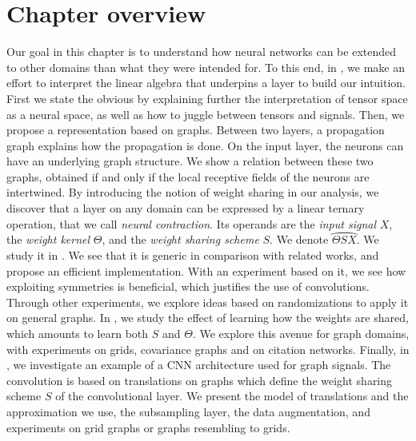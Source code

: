 \section*{Chapter overview}

Our goal in this chapter is to understand how neural networks can be extended to other domains than what they were intended for. To this end, in , we make an effort to interpret the linear algebra that underpins a layer to build our intuition. First we state the obvious by explaining further the interpretation of tensor space as a neural space, as well as how to juggle between tensors and signals. Then, we propose a representation based on graphs. Between two layers, a propagation graph explains how the propagation is done. On the input layer, the neurons can have an underlying graph structure. We show a relation between these two graphs, obtained if and only if the local receptive fields of the neurons are intertwined. By introducing the notion of weight sharing in our analysis, we discover that a layer on any domain can be expressed by a linear ternary operation, that we call \emph{neural contraction}. Its operands are the \emph{input signal} $X$, the \emph{weight kernel} $\Theta$, and the \emph{weight sharing scheme} $S$. We denote $\wideparen{\Theta S X}$. We study it in . We see that it is generic in comparison with related works, and propose an efficient implementation. With an experiment based on it, we see how exploiting symmetries is beneficial, which justifies the use of convolutions. Through other experiments, we explore ideas based on randomizations to apply it on general graphs. In , we study the effect of learning how the weights are shared, which amounts to learn both $S$ and $\Theta$. We explore this avenue for graph domains, with experiments on grids, covariance graphs and on citation networks. Finally, in , we investigate an example of a CNN architecture used for graph signals. The convolution is based on translations on graphs which define the weight sharing scheme $S$ of the convolutional layer. We present the model of translations and the approximation we use, the subsampling layer, the data augmentation, and experiments on grid graphs or graphs resembling to grids.
